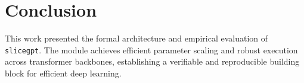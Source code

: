 \section{Conclusion}
This work presented the formal architecture and empirical evaluation of \texttt{slicegpt}. The module achieves efficient parameter scaling and robust execution across transformer backbones, establishing a verifiable and reproducible building block for efficient deep learning.
